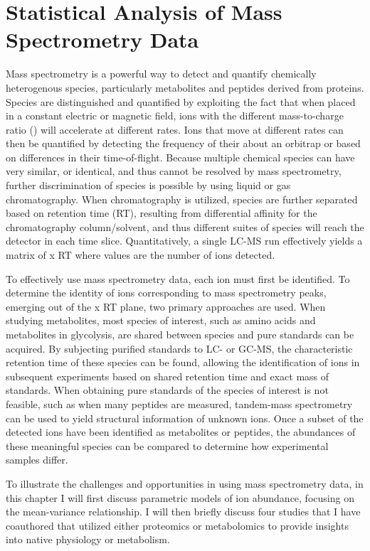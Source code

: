
\chapter{Statistical Analysis of Mass Spectrometry Data\label{ch:quant_anal}}

Mass spectrometry is a powerful way to detect and quantify chemically heterogenous species, particularly metabolites and peptides derived from proteins. Species are distinguished and quantified by exploiting the fact that when placed in a constant electric or magnetic field, ions with the different mass-to-charge ratio () will accelerate at different rates.  Ions that move at different rates can then be quantified by detecting the frequency of their  about an orbitrap or based on differences in their time-of-flight.  Because multiple chemical species can have very similar, or identical,  and thus cannot be resolved by mass spectrometry, further discrimination of species is possible by using liquid or gas chromatography.  When chromatography is utilized, species are further separated based on retention time (RT), resulting from differential affinity for the chromatography column/solvent, and thus different suites of species will reach the detector in each time slice.  Quantitatively, a single LC-MS run effectively yields a matrix of  x RT where values are the number of ions detected.  

To effectively use mass spectrometry data, each ion must first be identified. To determine the identity of ions corresponding to mass spectrometry peaks, emerging out of the  x RT plane, two primary approaches are used.  When studying metabolites, most species of interest, such as amino acids and metabolites in glycolysis, are shared between species and pure standards can be acquired.  By subjecting purified standards to LC- or GC-MS, the characteristic retention time of these species can be found, allowing the identification of ions in subsequent experiments based on shared retention time and exact mass of standards.  When obtaining pure standards of the species of interest is not feasible, such as when many peptides are measured, tandem-mass spectrometry can be used to yield structural information of unknown ions.  Once a subset of the detected ions have been identified as metabolites or peptides, the abundances of these meaningful species can be compared to determine how experimental samples differ.

To illustrate the challenges and opportunities in using mass spectrometry data, in this chapter I will first discuss parametric models of ion abundance, focusing on the mean-variance relationship. I will then briefly discuss four studies that I have coauthored that utilized either proteomics or metabolomics to provide insights into native physiology or metabolism.


